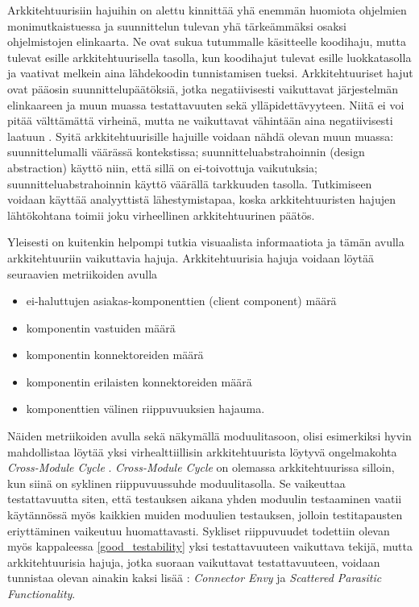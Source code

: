 \documentclass[finnish]{tktltiki2}
\numberwithin{table}{section}
\theoremstyle{definition}
\theoremstyle{remark}
\begin{document}
Arkkitehtuurisiin hajuihin on alettu kinnittää yhä enemmän huomiota ohjelmien monimutkaistuessa ja suunnittelun tulevan yhä tärkeämmäksi osaksi ohjelmistojen elinkaarta. Ne ovat sukua tutummalle käsitteelle koodihaju, mutta tulevat esille arkkitehtuurisella tasolla, kun koodihajut tulevat esille luokkatasolla ja vaativat melkein aina lähdekoodin tunnistamisen tueksi. Arkkitehtuuriset hajut ovat pääosin suunnittelupäätöksiä, jotka negatiivisesti vaikuttavat järjestelmän elinkaareen ja muun muassa testattavuuten sekä ylläpidettävyyteen. Niitä ei voi pitää välttämättä virheinä, mutta ne vaikuttavat vähintään aina negatiivisesti laatuun \citep{de_andrade_architectural_2014}. Syitä arkkitehtuurisille hajuille voidaan nähdä olevan muun muassa: suunnittelumalli väärässä kontekstissa;  suunnitteluabstrahoinnin (design abstraction) käyttö niin, että sillä on ei-toivottuja vaikutuksia; suunnitteluabstrahoinnin käyttö väärällä tarkkuuden tasolla. Tutkimiseen voidaan käyttää analyyttistä lähestymistapaa, koska arkkitehtuuristen hajujen lähtökohtana toimii joku virheellinen arkkitehtuurinen päätös.


Yleisesti on kuitenkin helpompi tutkia visuaalista informaatiota ja tämän avulla arkkitehtuuriin vaikuttavia hajuja. Arkkitehtuurisia hajuja voidaan löytää seuraavien metriikoiden avulla \citep{bertran_detecting_2011}

\begin{itemize}
	\item ei-haluttujen asiakas-komponenttien (client component) määrä
	\item komponentin vastuiden määrä
	\item komponentin konnektoreiden määrä
	\item komponentin erilaisten konnektoreiden määrä
	\item komponenttien välinen riippuvuuksien hajauma.
\end{itemize}


\noindent
Näiden metriikoiden avulla sekä näkymällä moduulitasoon, olisi esimerkiksi hyvin mahdollistaa löytää yksi virhealttiillisin arkkitehtuurista löytyvä ongelmakohta \textit{Cross-Module Cycle} \citep[s. 57]{HotSpot}. \textit{Cross-Module Cycle} on olemassa arkkitehtuurissa silloin, kun siinä on syklinen riippuvuussuhde moduulitasolla. Se vaikeuttaa testattavuutta siten, että testauksen aikana yhden moduulin testaaminen vaatii käytännössä myös kaikkien muiden moduulien testauksen, jolloin testitapausten eriyttäminen vaikeutuu huomattavasti. Sykliset riippuvuudet todettiin olevan myös kappaleessa \ref{good_testability} yksi testattavuuteen vaikuttava tekijä, mutta arkkitehtuurisia hajuja, jotka suoraan vaikuttavat testattavuuteen, voidaan tunnistaa olevan ainakin kaksi lisää \citep{garcia_identifying_2009}:  \textit{Connector Envy} ja \textit{Scattered Parasitic Functionality}.
\end{document}
